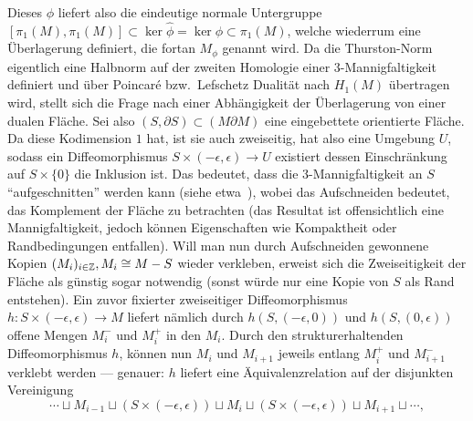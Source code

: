 \begin{constr}
	Dieses $\phi$ liefert also die eindeutige normale Untergruppe $[\pi_1(M),\pi_1(M)]\subset\ker\hat\phi = \ker \phi \subset \pi_1(M)$, welche wiederrum eine Überlagerung definiert, die fortan $M_\phi$ genannt wird. Da die Thurston-Norm eigentlich eine Halbnorm auf der zweiten Homologie einer 3-Mannigfaltigkeit definiert und über Poincaré bzw.~Lefschetz Dualität nach $H_1(M)$ übertragen wird, stellt sich die Frage nach einer Abhängigkeit der Überlagerung von einer dualen Fläche. Sei also $(S,\partial S) \subset (M\partial M)$ eine eingebettete orientierte Fläche. Da diese Kodimension $1$ hat, ist sie auch zweiseitig, hat also eine Umgebung $U$, sodass ein Diffeomorphismus $S\times (-\epsilon,\epsilon) \to U$ existiert dessen Einschränkung auf $S\times \{0\}$ die Inklusion ist. Das bedeutet, dass die 3-Mannigfaltigkeit an $S$ "`aufgeschnitten"' werden kann (siehe etwa~\cite[Kapitel~4.2]{Burde.2003}), wobei das Aufschneiden bedeutet, das Komplement der Fläche zu betrachten (das Resultat ist offensichtlich eine Mannigfaltigkeit, jedoch können Eigenschaften wie Kompaktheit oder Randbedingungen entfallen). Will man nun durch Aufschneiden gewonnene Kopien $(M_i)_{i\in \mathbb{Z}}, M_i \cong M-S$ wieder verkleben, erweist sich die Zweiseitigkeit der Fläche als günstig sogar notwendig (sonst würde nur eine Kopie von $S$ als Rand entstehen). Ein zuvor fixierter zweiseitiger Diffeomorphismus $h: S\times (-\epsilon,\epsilon) \to M$ liefert nämlich durch $h(S,(-\epsilon,0))$ und $h(S,(0,\epsilon))$ offene Mengen $M_i^-$ und $M_i^+$ in den $M_i$. Durch den strukturerhaltenden Diffeomorphismus $h$, können nun $M_i$ und $M_{i+1}$ jeweils entlang $M_i^+$ und $M_{i+1}^-$ verklebt werden --- genauer: $h$ liefert eine Äquivalenzrelation auf der disjunkten Vereinigung 
	\[
		\cdots \sqcup M_{i-1} \sqcup (S \times (-\epsilon,\epsilon)) \sqcup M_i \sqcup  (S \times (-\epsilon,\epsilon)) \sqcup M_{i+1} \sqcup \cdots,
	\]

\end{constr}
